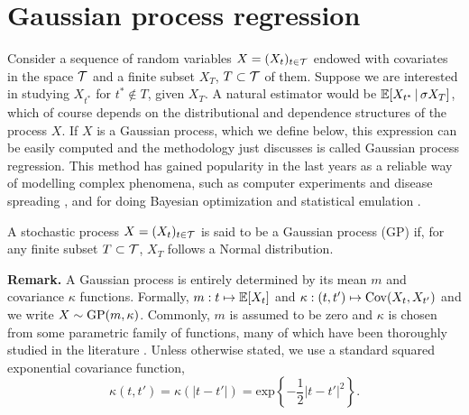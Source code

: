 

\section{Gaussian process regression} \label{section:GPs}


Consider a sequence of random variables $X = (X_t)_{t \in \mathcal{T}}$ endowed with covariates in the space $\mathcal{T}$ and a finite subset $X_T$, $T \subset \mathcal{T}$ of them. Suppose we are interested in studying $X_{t^{*}}$ for $t^{*} \notin T$, given $X_T$. A natural estimator would be $\mathbb{E} [X_{t^{*}} \, | \, \sigma X_T ]$, which of course depends on the distributional and dependence structures of the process $X$. If $X$ is a Gaussian process, which we define below, this expression can be easily computed and the methodology just discusses is called Gaussian process regression. This method has gained popularity in the last years as a reliable way of modelling complex phenomena, such as computer experiments \cite{SacksEtAl:1989:CompExp} and disease spreading \cite{PokharelDeardon:2016:GPInfectDisease}, and for doing Bayesian optimization \cite{Frazier:2018:BayesOptTutorial} and statistical emulation \cite{WoodsEtAl:2017:ACEAlgorithm}.



\begin{definition} \label{def:GP}
	A stochastic process $X = (X_t)_{t \in \mathcal{T}}$ is said to be a Gaussian process (GP) if, for any finite subset $T \subset \mathcal{T}$, $X_T$ follows a Normal distribution. 
\end{definition}


\textbf{Remark.} A Gaussian process is entirely determined by its mean $m$ and covariance $\kappa$ functions. Formally, $m: t \mapsto \mathbb{E}[X_t]$ and $\kappa: (t, t') \mapsto \mathrm{Cov}(X_t, X_{t'})$ and we write $X \sim \mathrm{GP} (m, \kappa)$. Commonly, $m$ is assumed to be zero and $\kappa$ is chosen from some parametric family of functions, many of which have been thoroughly studied in the literature \cite[see][Ch.~4]{RasmussenWilliams:2006}. Unless otherwise stated, we use a standard squared exponential covariance function,
\begin{equation} \label{eq:sq_exp_cov}
	\kappa(t, t') = \kappa(|t-t'|) = \mathrm{exp} \left\{ -\frac{1}{2} |t-t'|^2 \right\}.
\end{equation}



